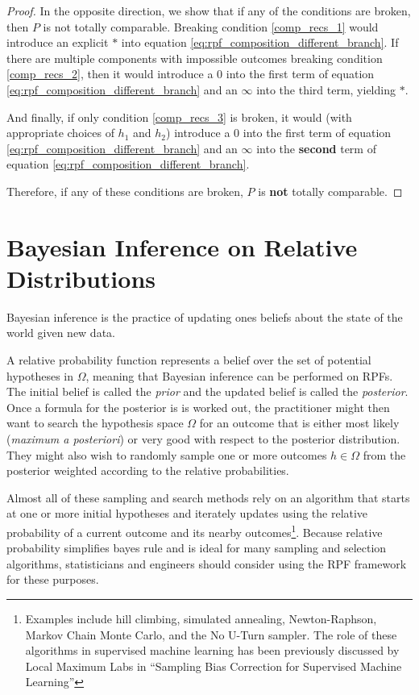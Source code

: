 \documentclass[twoside]{article}
\newcommand{\quotes}[1]{``#1''}
\theoremstyle{plain}%
\theoremstyle{definition}
\theoremstyle{remark}
\begin{document}
\begin{proof}
In the opposite direction, we show that if any of the conditions are broken, then \(P\) is not totally comparable. Breaking condition \ref{comp_recs_1} would introduce an explicit \(\ast\) into equation \ref{eq:rpf_composition_different_branch}. If there are multiple components with impossible outcomes breaking condition \ref{comp_recs_2}, then it would introduce a \(0\) into the first term of equation \ref{eq:rpf_composition_different_branch} and an \(\infty\) into the third term, yielding \(\ast\).

And finally, if only condition \ref{comp_recs_3} is broken, it would (with appropriate choices of \(h_1\) and \(h_2\)) introduce a 0 into the first term of equation \ref{eq:rpf_composition_different_branch} and an \(\infty\) into the \textbf{second} term of equation \ref{eq:rpf_composition_different_branch}.

Therefore, if any of these conditions are broken, \(P\) is \textbf{not} totally comparable.
\end{proof}

\section{Bayesian Inference on Relative Distributions}

Bayesian inference is the practice of updating ones beliefs about the state of the world given new data.

A relative probability function represents a belief over the set of potential hypotheses in \(\Omega\), meaning that Bayesian inference can be performed on RPFs. The initial belief is called the \textit{prior} and the updated belief is called the \textit{posterior}. Once a formula for the posterior is is worked out, the practitioner might then want to search the hypothesis space \(\Omega\) for an outcome that is either most likely (\textit{maximum a posteriori}) or very good with respect to the posterior distribution. They might also wish to randomly sample one or more outcomes \(h \in \Omega\) from the posterior weighted according to the relative probabilities.

Almost all of these sampling and search methods rely on an algorithm that starts at one or more initial hypotheses and iterately updates using the relative probability of a current outcome and its nearby outcomes\footnote{Examples include hill climbing, simulated annealing, Newton-Raphson, Markov Chain Monte Carlo, and the No U-Turn sampler. The role of these algorithms in supervised machine learning has been previously discussed by Local Maximum Labs in \quotes{Sampling Bias Correction for Supervised Machine Learning\cite{sklar_bias}}}. Because relative probability simplifies bayes rule and is ideal for many sampling and selection algorithms, statisticians and engineers should consider using the RPF framework for these purposes.
\end{document}
